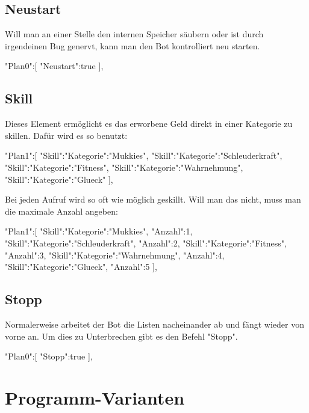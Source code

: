 \documentclass{scrartcl}
\begin{document}
\subsection{Neustart}
Will man an einer Stelle den internen Speicher säubern oder ist durch irgendeinen Bug genervt, kann man den Bot kontrolliert neu starten.

\begin{code}[language=bash]
"Plan0":[
	{"Neustart":true}
],
\end{code}


\subsection{Skill}

Dieses Element ermöglicht es das erworbene Geld direkt in einer Kategorie zu
skillen. Dafür wird es so benutzt:

\begin{code}[language=bash]
"Plan1":[
	{"Skill":{"Kategorie":"Mukkies"}},
	{"Skill":{"Kategorie":"Schleuderkraft"}},
	{"Skill":{"Kategorie":"Fitness"}},
	{"Skill":{"Kategorie":"Wahrnehmung"}},
	{"Skill":{"Kategorie":"Glueck"}}
],
\end{code}

Bei jeden Aufruf wird so oft wie möglich geskillt. Will man das nicht, muss man die maximale Anzahl angeben:

\begin{code}[language=bash]
"Plan1":[
	{"Skill":{"Kategorie":"Mukkies", "Anzahl":1}},
	{"Skill":{"Kategorie":"Schleuderkraft", "Anzahl":2}},
	{"Skill":{"Kategorie":"Fitness", "Anzahl":3}},
	{"Skill":{"Kategorie":"Wahrnehmung", "Anzahl":4}},
	{"Skill":{"Kategorie":"Glueck", "Anzahl":5}}
],
\end{code}

\subsection{Stopp}
Normalerweise arbeitet der Bot die Listen nacheinander ab und fängt wieder von vorne an. Um dies zu Unterbrechen gibt es den Befehl "Stopp".

\begin{code}[language=bash]
"Plan0":[
	{"Stopp":true}
],
\end{code}


\section{Programm-Varianten}
\end{document}
